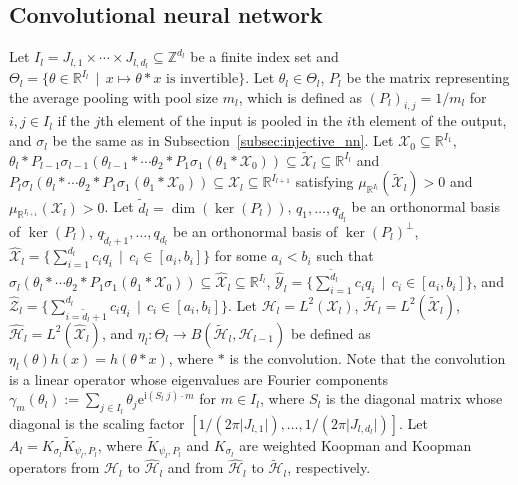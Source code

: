 \documentclass[twoside]{article}
\def\mcl#1{\mathcal{#1}}
\def\hil{\mcl{H}}
\def\opn{\operatorname}
\def\mr{\mathrm}
\begin{document}
\subsection{Convolutional neural network}\label{subsec:cnn}
Let $I_l=J_{l,1}\times\cdots\times J_{l,d_l}\subseteq \mathbb{Z}^{d_l}$ be a finite index set and $\Theta_l=\{\theta\in \mathbb{R}^{I_l}\,\mid\, x\mapsto \theta\ast x\mbox{ is invertible}\}$.
Let $\theta_l\in\Theta_l$, $P_l$ be the matrix representing the average pooling with pool size $m_l$, which is defined as $(P_l)_{i,j}=1/m_l$ for $i,j\in I_l$ if the $j$th element of the input is pooled in the $i$th element of the output, and $\sigma_l$ be the same as in Subsection~\ref{subsec:injective_nn}.
Let $\mcl{X}_0\subseteq \mathbb{R}^{I_1}$, 
$\theta_l\ast P_{l-1}\sigma_{l-1}(\theta_{l-1}\ast\cdots \theta_2\ast P_1\sigma_1(\theta_1\ast \mcl{X}_0))\subseteq \tilde{\mcl{X}}_{l}\subseteq \mathbb{R}^{I_l}$ and $P_{l}\sigma_{l}(\theta_{l}\ast\cdots \theta_2\ast P_1\sigma_1(\theta_1\ast \mcl{X}_0))\subseteq {\mcl{X}}_{l}\subseteq \mathbb{R}^{I_{l+1}}$ satisfying $\mu_{\mathbb{R}^{I_l}}(\tilde{\mcl{X}}_l)>0$ and $\mu_{\mathbb{R}^{I_{l+1}}}(\mcl{X}_l)>0$.
Let $\tilde{d}_l=\opn{dim}(\opn{ker}(P_{l}))$, $q_1,\ldots,q_{\tilde{d}_l}$ be an orthonormal basis of $\opn{ker}(P_l)$, $q_{\tilde{d}_l+1},\ldots, q_{d_l}$ be an orthonormal basis of $\opn{ker}(P_l)^{\perp}$, $\hat{\mcl{X}}_l=\{\sum_{i=1}^{d_l}c_iq_i\,\mid\,c_i\in [a_i,b_i]\}$ for some $a_i<b_i$ such that $\sigma_{l}(\theta_{l}\ast\cdots \theta_2\ast P_1\sigma_1(\theta_1\ast \mcl{X}_0))\subseteq \hat{\mcl{X}}_{l}\subseteq \mathbb{R}^{I_{l}}$, $\hat{\mcl{Y}}_l=\{\sum_{i=1}^{\tilde{d}_l}c_iq_i\,\mid\,c_i\in [a_i,b_i]\}$, and $\hat{\mcl{Z}}_l=\{\sum_{i=\tilde{d}_l+1}^{d_l}c_iq_i\,\mid\,c_i\in [a_i,b_i]\}$. 
Let $\hil_l=L^2(\mcl{X}_l)$, $\tilde{\hil}_l=L^2(\tilde{\mcl{X}}_l)$, $\hat{\hil}_l=L^2(\hat{\mcl{X}}_l)$, and $\eta_l:\Theta_l\to B(\tilde{\hil}_l,\hil_{l-1})$ be defined as $\eta_l(\theta)h(x)=h(\theta\ast x)$, where $\ast$ is the convolution.
Note that the convolution is a linear operator whose eigenvalues are Fourier components $\gamma_m(\theta_l):=\sum_{j\in I_l}\theta_j\mr{e}^{\mr{i}(S_l\;j)\cdot m}$ for $m\in I_l$, where $S_l$ is the diagonal matrix whose diagonal is the scaling factor $[1/(2\pi \vert J_{l,1}\vert),\ldots,1/(2\pi \vert J_{l,d_l}\vert)]$.
Let 
$A_l=K_{\sigma_l}\tilde{K}_{\psi_l,P_l}$, where $\tilde{K}_{\psi_l,P_l}$ and $K_{\sigma_l}$ are weighted Koopman and Koopman operators from ${\hil}_l$ to $\hat{\hil}_l$ and from $\hat{\hil}_l$ to $\tilde{\hil}_{l}$, respectively.
\end{document}
